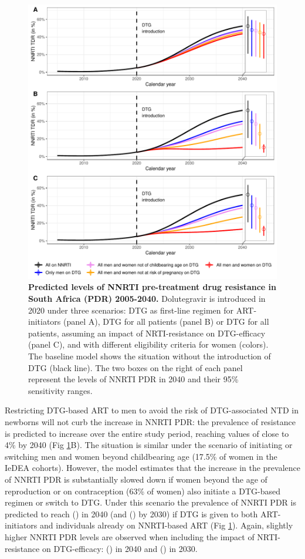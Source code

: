 \documentclass[10pt,letterpaper]{article}
\begin{document}
\begin{figure}[h!]
   \includegraphics[width=14cm]{../figures/Fig3.pdf}
   \vspace{0.5cm}
   \caption{{\bf Predicted levels of NNRTI pre-treatment drug resistance in South Africa (PDR) 2005-2040.}
Dolutegravir is introduced in 2020 under three scenarios: DTG as first-line regimen for ART-initiators (panel A), DTG for all patients (panel B) or DTG for all patients, assuming an impact of NRTI-resistance on DTG-efficacy (panel C), and with different eligibility criteria for women (colors). The baseline model shows the situation without the introduction of DTG (black line). The two boxes on the right of each panel represent the levels of NNRTI PDR in 2040 and their 95\% sensitivity ranges.}\label{fig3}
\end{figure}

Restricting DTG-based ART to men to avoid the risk of DTG-associated NTD in newborns will not curb the increase in NNRTI PDR: the prevalence of resistance is predicted to increase over the entire study period, reaching values of close to 4\% by 2040 (Fig \ref{fig3}B). The situation is similar under the scenario of initiating or switching men and women beyond childbearing age (17.5\% of women in the IeDEA cohorts). However, the model estimates that the increase in the prevalence of NNRTI PDR is substantially slowed down if women beyond the age of reproduction or on contraception (63\% of women) also initiate a DTG-based regimen or switch to DTG. Under this scenario the prevalence of NNRTI PDR is predicted to reach \numberia (\numberib) in 2040 (and \numberha (\numberhb) by 2030) if DTG is given to both ART-initiators and individuals already on NNRTI-based ART (Fig \ref{fig3}). Again, slightly higher NNRTI PDR levels are observed when including the impact of NRTI-resistance on DTG-efficacy: \numberic (\numberid) in 2040 and \numberhc (\numberhd) in 2030.
\end{document}
